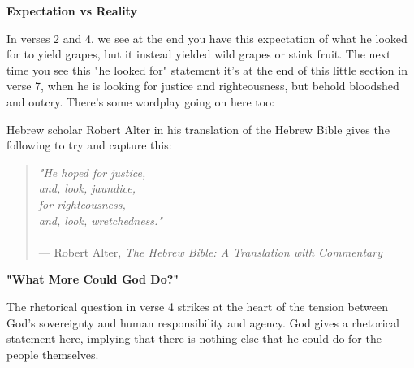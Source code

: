 \documentclass[11pt]{article}
\begin{document}
\vspace{3em}
{\large\bfseries Expectation vs Reality}
\vspace{1em}


In verses 2 and 4, we see at the end you have this expectation of what he looked for to yield grapes, but it instead yielded wild grapes or stink fruit. The next time you see this "he looked for" statement it's at the end of this little section in verse 7, when he is looking for justice and righteousness, but behold bloodshed and outcry. There's some wordplay going on here too:



Hebrew scholar Robert Alter in his translation of the Hebrew Bible gives the following to try and capture this:

\begin{quote}
\textit{"He hoped for justice,\\ and, look, jaundice,\\ for righteousness,\\ and, look, wretchedness."}\\\\
\hfill --- Robert Alter, \textit{The Hebrew Bible: A Translation with Commentary}
\end{quote}

\vspace{3em}
{\large\bfseries "What More Could God Do?"}
\vspace{1em}

The rhetorical question in verse 4 strikes at the heart of the tension between God's sovereignty and human responsibility and agency.  God gives a rhetorical statement here, implying that there is nothing else that he could do for the people themselves. 
\newpage
\end{document}
